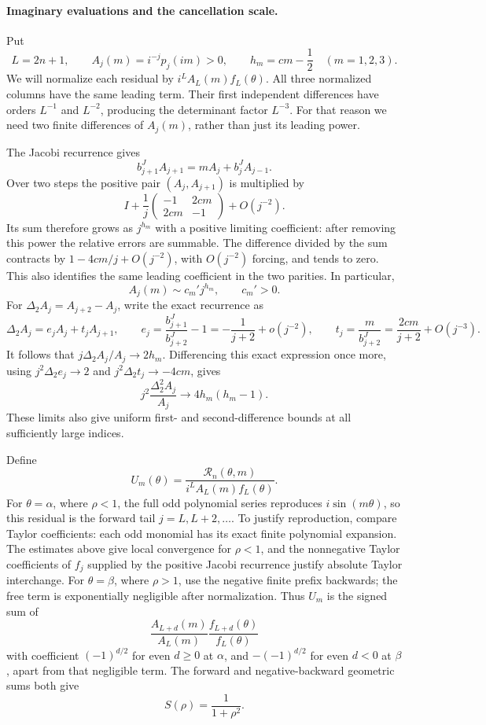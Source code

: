 \documentclass[11pt]{article}
\numberwithin{equation}{section}
\theoremstyle{definition}\newtheorem{definition}[theorem]{Definition}
\theoremstyle{remark}\newtheorem{remark}[theorem]{Remark}
\begin{document}
\paragraph{Imaginary evaluations and the cancellation scale.}
Put
\[
 L=2n+1,\qquad A_j(m)=i^{-j}p_j(im)>0,
 \qquad h_m=cm-\frac12 \quad(m=1,2,3).
\]
We will normalize each residual by $i^L A_L(m)f_L(\theta)$.
All three normalized columns have the same leading term. Their first
independent differences have orders $L^{-1}$ and $L^{-2}$, producing
the determinant factor $L^{-3}$. For that reason we need two finite
differences of $A_j(m)$, rather than just its leading power.

The Jacobi recurrence gives
\[
 b_{j+1}^{J}A_{j+1}=mA_j+b_j^{J}A_{j-1}.
\]
Over two steps the positive pair $(A_j,A_{j+1})$ is multiplied by
\[
 I+\frac1j\begin{pmatrix}-1&2cm\\2cm&-1\end{pmatrix}+O(j^{-2}).
\]
Its sum therefore grows as $j^{h_m}$ with a positive limiting
coefficient: after removing this power the relative errors are summable.
The difference divided by the sum contracts by
$1-4cm/j+O(j^{-2})$, with $O(j^{-2})$ forcing, and tends to zero.
This also identifies the same leading coefficient in the two parities.
In particular,
\[
 A_j(m)\sim c_m'j^{h_m},\qquad c_m'>0.
\]
For $\Delta_2 A_j=A_{j+2}-A_j$, write the exact recurrence as
\[
 \Delta_2 A_j=e_jA_j+t_jA_{j+1},\qquad
 e_j=\frac{b_{j+1}^{J}}{b_{j+2}^{J}}-1
       =-\frac1{j+2}+o(j^{-2}),\qquad
 t_j=\frac m{b_{j+2}^{J}}=\frac{2cm}{j+2}+O(j^{-3}).
\]
It follows that $j\Delta_2A_j/A_j\to2h_m$.
Differencing this exact expression once more, using
$j^2\Delta_2 e_j\to2$ and $j^2\Delta_2t_j\to-4cm$, gives
\[
 j^2\frac{\Delta_2^2 A_j}{A_j}\longrightarrow4h_m(h_m-1).
\]
These limits also give uniform first- and second-difference bounds at
all sufficiently large indices.

Define
\[
 U_m(\theta)=\frac{\mathscr R_n(\theta,m)}{i^L A_L(m)f_L(\theta)}.
\]
For $\theta=\alpha$, where $\rho<1$, the full odd polynomial series
reproduces $i\sin(m\theta)$, so this residual is the forward tail
$j=L,L+2,\ldots$. To justify reproduction, compare Taylor coefficients:
each odd monomial has its exact finite polynomial expansion. The
estimates above give local convergence for $\rho<1$, and the
nonnegative Taylor coefficients of $f_j$ supplied by the positive
Jacobi recurrence justify absolute Taylor interchange. For
$\theta=\beta$, where $\rho>1$, use the negative finite prefix
backwards; the free term is exponentially negligible after normalization.
Thus $U_m$ is the signed sum of
\[
 \frac{A_{L+d}(m)}{A_L(m)}\frac{f_{L+d}(\theta)}{f_L(\theta)}
\]
with coefficient $(-1)^{d/2}$ for even $d\ge0$ at $\alpha$, and
$-(-1)^{d/2}$ for even $d<0$ at $\beta$, apart from that negligible term.
The forward and negative-backward geometric sums both give
\[
 S(\rho)=\frac1{1+\rho^2}.
\]
\end{document}
